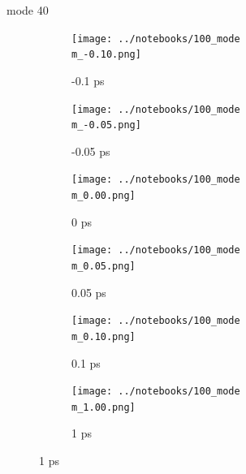 \documentclass{beamer}
\newcommand\w{0.32}
\begin{document}
\renewcommand\m{40}
\begin{frame}{mode \m}
	\begin{figure}
		\centering
		\begin{subfigure}[b]{\w\textwidth}
			\centering
			\texttt{[image: ../notebooks/100\_mode\\m\_-0.10.png]}
			\caption{-0.1 ps}
		\end{subfigure}
		\begin{subfigure}[b]{\w\textwidth}
			\centering
			\texttt{[image: ../notebooks/100\_mode\\m\_-0.05.png]}
			\caption{-0.05 ps}
		\end{subfigure}
		\begin{subfigure}[b]{\w\textwidth}
			\centering
			\texttt{[image: ../notebooks/100\_mode\\m\_0.00.png]}
			\caption{0 ps}
		\end{subfigure}
		\begin{subfigure}[b]{\w\textwidth}
			\centering
			\texttt{[image: ../notebooks/100\_mode\\m\_0.05.png]}
			\caption{0.05 ps}
		\end{subfigure}
		\begin{subfigure}[b]{\w\textwidth}
			\centering
			\texttt{[image: ../notebooks/100\_mode\\m\_0.10.png]}
			\caption{0.1 ps}
		\end{subfigure}
		\begin{subfigure}[b]{\w\textwidth}
			\centering
			\texttt{[image: ../notebooks/100\_mode\\m\_1.00.png]}
			\caption{1 ps}
		\end{subfigure}
	\end{figure}
\end{frame}
\end{document}
